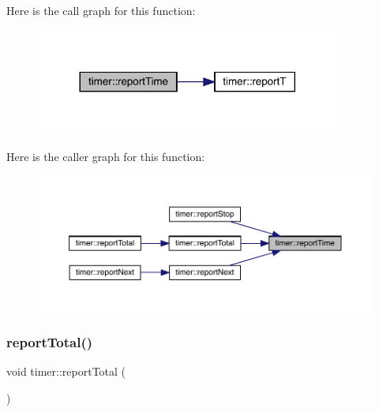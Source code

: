 Here is the call graph for this function\+:\nopagebreak
\begin{figure}[H]
\begin{center}
\leavevmode
\includegraphics[width=284pt]{structtimer_adcf87a7455e8e9ca9abb133427bebb39_cgraph}
\end{center}
\end{figure}
Here is the caller graph for this function\+:\nopagebreak
\begin{figure}[H]
\begin{center}
\leavevmode
\includegraphics[width=350pt]{structtimer_adcf87a7455e8e9ca9abb133427bebb39_icgraph}
\end{center}
\end{figure}
\mbox{\label{structtimer_a94d8ef06e519bc2daad6a2871769dcc6}} 
\subsubsection{\texorpdfstring{reportTotal()}{reportTotal()}\hspace{0.1cm}{\footnotesize\ttfamily [1/2]}}
{\footnotesize\ttfamily void timer\+::report\+Total (\begin{DoxyParamCaption}{ }\end{DoxyParamCaption})\hspace{0.3cm}{\ttfamily [inline]}}

